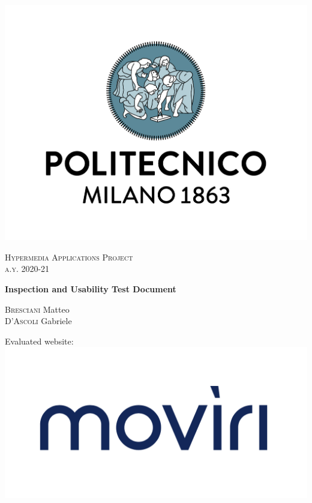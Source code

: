 \documentclass[fontsize=11pt,paper=a4,pagesize=auto]{report}
\begin{document}
\begin{titlepage}
	\centering
	\bigskip
	\bigskip
	\includegraphics[scale = 0.25]{images/polimi.jpg}\par
	
	{\scshape\Large
		Hypermedia Applications Project\\
		a.y. 2020-21\par}
			\vspace{0.5cm}
	{\huge\bfseries
	\bigskip
		Inspection and Usability Test Document\\\par}

	\vspace{0.5cm}
	{\Large
		{\scshape Bresciani} Matteo\\
		{\scshape D'Ascoli}  Gabriele\par

		}
			\vspace{1cm}

		{\huge\Large
		\bigskip
		Evaluated website:}\\
\bigskip
		\includegraphics[scale = 0.30]{images/moviri-logo.png}\par
		
	
\end{titlepage}
\end{document}
